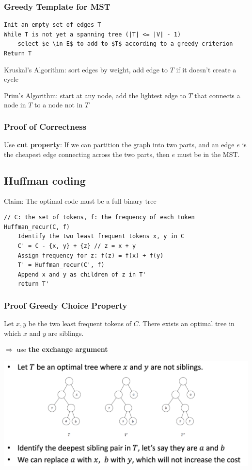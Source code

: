 \documentclass[12pt,a4paper]{article}
\begin{document}
\subsubsection{Greedy Template for MST}

\begin{verbatim}
Init an empty set of edges T
While T is not yet a spanning tree (|T| <= |V| - 1) 
    select $e \in E$ to add to $T$ according to a greedy criterion
Return T
\end{verbatim}

Kruskal's Algorithm: sort edges by weight, add edge to $T$ if it doesn't create a cycle

Prim's Algorithm: start at any node, add the lightest edge to $T$ that connects a node in $T$ to a node not in $T$

\subsubsection{Proof of Correctness}

Use \textbf{cut property}: If we can partition the graph into two parts, 
and an edge $e$ is the cheapest edge connecting across the two parts, then $e$ must be in the MST.

\subsection*{Huffman coding}

Claim: The optimal code must be a full binary tree

\begin{verbatim}
// C: the set of tokens, f: the frequency of each token
Huffman_recur(C, f)
    Identify the two least frequent tokens x, y in C
    C' = C - {x, y} + {z} // z = x + y
    Assign frequency for z: f(z) = f(x) + f(y)
    T' = Huffman_recur(C', f)
    Append x and y as children of z in T'
    return T'
\end{verbatim}

\subsubsection*{Proof Greedy Choice Property}

Let $x,y$ be the two least frequent tokens of $C$.
There exists an optimal tree in which $x$ and $y$ are siblings.

\(\Rightarrow\) use \textbf{the exchange argument}

\includegraphics[width=\textwidth]{./images/the_exchange_argument.png}
\end{document}
